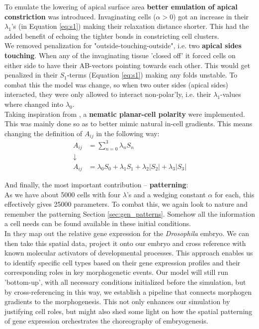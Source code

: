 To emulate the lowering of apical surface area \textbf{better emulation of apical constriction} was introduced. Invaginating cells ($\alpha > 0$) got an increase in their $\lambda_1$'s (in Equation \ref{eq:s1}) making their relaxation distance shorter. This had the added benefit of echoing the tighter bonds in constricting cell clusters.\\

We removed penalization for "outside-touching-outside", i.e. two \textbf{apical sides touching}. When any of the invaginating tissue 'closed off' it forced cells on either side to have their AB-vectors pointing towards each other. This would get penalized in their $S_1$-terms (Equation \ref{eq:s1}) making any folds unstable. To combat this the model was change, so when two outer sides (apical sides) interacted, they were only allowed to interact non-polar'ly, i.e. their $\lambda_1$-values where changed into $\lambda_0$.\\


Taking inspiration from , a \textbf{nematic planar-cell polarity} were implemented. This was mainly done so as to better mimic natural in-cell gradients. This means changing the definition of $A_{ij}$ in the following way:
\begin{align*}
    A_{ij}&=\sum_{n=0}^{3}\lambda_n  S_n\\ \downarrow \\A_{ij}&=\lambda_0S_0+\lambda_1S_1+\lambda_2|S_2|+\lambda_3|S_3|
\end{align*}


And finally, the most important contribution -- \textbf{patterning}:\\
As we have about 5000 cells with four $\lambda$'s and a wedging constant $\alpha$ for each, this effectively gives 25000 parameters. To combat this, we again look to nature and remember the patterning Section \ref{sec:gen_patterns}. Somehow all the information a cell needs can be found available in these initial conditions.\\


In  they map out the relative gene expression for the \textit{Drosophila} embryo. We can then take this spatial data, project it onto our embryo and cross reference with known molecular activators of developmental processes. This approach enables us to identify specific cell types based on their gene expression profiles and their corresponding roles in key morphogenetic events. Our model will still run 'bottom-up', with all necessary conditions initialized before the simulation, but by cross-referencing in this way, we establish a pipeline that connects morphogen gradients to the morphogenesis. This not only enhances our simulation by justifying cell roles, but might also shed some light on how the spatial patterning of gene expression orchestrates the choreography of embryogenesis. 


